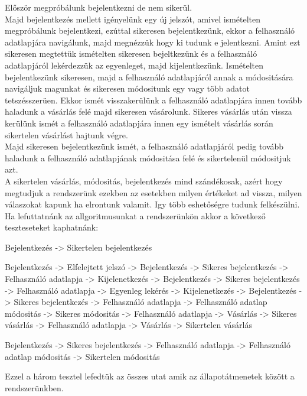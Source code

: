 \documentclass[12pt]{article}
\begin{document}
Először megpróbálunk bejelentkezni de nem sikerül.\\
Majd bejelentkezés mellett igényelünk egy új jelszót, amivel ismételten megpróbálunk bejelentkezi, ezúttal sikeresen bejelentkezünk, ekkor a felhasználó adatlapjára navigálunk, majd megnézzük hogy ki tudunk e jelentkezni. Amint ezt sikeresen megtettük ismételten sikeresen bejeltkezünk és a felhasználó adatlapjáról lekérdezzük az egyenleget, majd kijelentkezünk. Ismételten bejelentkezünk sikeresen, majd a felhasználó adatlapjáról annak a módositására navigáljuk magunkat és sikeresen módositunk egy vagy több adatot tetszésszerüen. Ekkor ismét visszakerülünk a felhasználó adatlapjára innen tovább haladunk a vásárlás felé majd sikeresen vásárolunk. Sikeres vásárlás után vissza kerülünk ismét a felhasználó adatlapjára innen egy ismételt vásárlás során sikertelen vásárlást hajtunk végre.\\
Majd sikeresen bejelentkezünk ismét, a felhasználó adatlapjáról pedig tovább haladunk a felhasználó adatlapjának módositása felé és sikertelenül módositjuk azt.\\

A sikertelen vásárlás, módositás, bejelentkezés mind szándékosak, azért hogy megtudjuk a rendszerünk ezekben az esetekben milyen értékeket ad vissza, milyen válaszokat kapunk ha elrontunk valamit. Igy több eshetőségre tudunk felkészülni.\\

Ha lefuttatnánk az allgoritmusunkat a rendszerünkön akkor a következő teszteseteket kaphatnánk:

\item Bejelentkezés -> Sikertelen bejelentkezés
\item Bejelentkezés -> Elfelejtett jelszó -> Bejelentkezés -> Sikeres bejelentkezés -> Felhasználó adatlapja -> Kijelenetkezés -> Bejelentkezés -> Sikeres bejelentkezés -> Felhasználó adatlapja -> Egyenleg lekérés -> Kijelenetkezés -> Bejelentkezés -> Sikeres bejelentkezés -> Felhasználó adatlapja -> Felhasználó adatlap módositás -> Sikeres módositás -> Felhasználó adatlapja -> Vásárlás -> Sikeres vásárlás -> Felhasználó adatlapja -> Vásárlás -> Sikertelen vásárlás
\item Bejelentkezés -> Sikeres bejelentkezés -> Felhasználó adatlapja -> Felhasználó adatlap módositás -> Sikertelen módositás

Ezzel a három tesztel lefedtük az összes utat amik az állapotátmenetek között a rendszerünkben.\\
\end{document}
